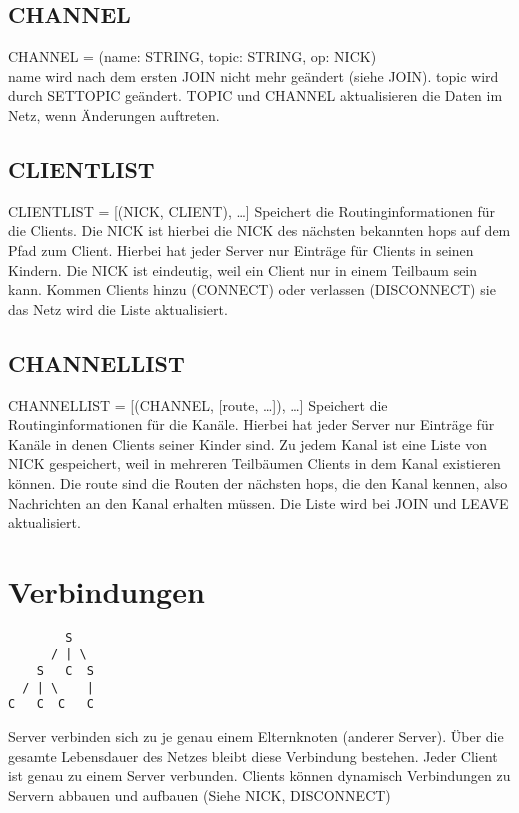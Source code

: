 \documentclass{article}
\begin{document}
\subsection{CHANNEL}

CHANNEL = (name: STRING, topic: STRING, op: NICK)\\
name wird nach dem ersten JOIN nicht mehr geändert (siehe JOIN). topic wird durch SETTOPIC geändert. TOPIC und CHANNEL aktualisieren die Daten im Netz, wenn Änderungen auftreten.

\subsection{CLIENTLIST}

CLIENTLIST = [(NICK, CLIENT), \ldots]
Speichert die Routinginformationen für die Clients. Die NICK ist hierbei die NICK des nächsten bekannten hops auf dem Pfad zum Client. Hierbei hat jeder Server nur Einträge für Clients in seinen Kindern. Die NICK ist eindeutig, weil ein Client nur in einem Teilbaum sein kann. Kommen Clients hinzu (CONNECT) oder verlassen (DISCONNECT) sie das Netz wird die Liste aktualisiert.

\subsection{CHANNELLIST}

CHANNELLIST = [(CHANNEL, [route, \ldots]), \ldots]
Speichert die Routinginformationen für die Kanäle. Hierbei hat jeder Server nur Einträge für Kanäle in denen Clients seiner Kinder sind. Zu jedem Kanal ist eine Liste von NICK gespeichert, weil in mehreren Teilbäumen Clients in dem Kanal existieren können. Die route sind die Routen der nächsten hops, die den Kanal kennen, also Nachrichten an den Kanal erhalten müssen. Die Liste wird bei JOIN und LEAVE aktualisiert.


\section{Verbindungen}

\begin{lstlisting}
        S
      / | \
    S   C  S
  / | \    |
C   C  C   C
\end{lstlisting}

Server verbinden sich zu je genau einem Elternknoten (anderer Server). Über die gesamte Lebensdauer des Netzes bleibt diese Verbindung bestehen.
Jeder Client ist genau zu einem Server verbunden.
Clients können dynamisch Verbindungen zu Servern abbauen und aufbauen (Siehe NICK, DISCONNECT)
\end{document}
